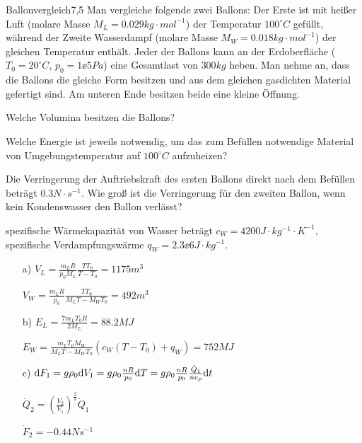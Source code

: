 \begin{problem}{Ballonvergleich}{7,5}
Man vergleiche folgende zwei Ballons: Der Erste ist mit heißer Luft (molare Masse $M_L = 0.029 \unit{kg \cdot mol^{-1}}$) der Temperatur $100^\circ \unit{C}$ gefüllt, während der Zweite Wasserdampf (molare Masse $M_W = 0.018 \unit{kg \cdot mol^{-1}}$) der gleichen Temperatur enthält. Jeder der Ballons kann an der Erdoberfläche ($T_0 = 20^\circ \unit{C}$, $p_0 = 1 \ee{5} \unit{Pa}$) eine Gesamtlast von $300 \unit{kg}$ heben. Man nehme an, dass die Ballons die gleiche Form besitzen und aus dem gleichen gasdichten Material gefertigt sind. Am unteren Ende besitzen beide eine kleine Öffnung.
\begin{abcenum}
 \item Welche Volumina besitzen die Ballons?
 \item Welche Energie ist jeweils notwendig, um das zum Befüllen notwendige Material von Umgebungstemperatur auf $100^\circ \unit{C}$ aufzuheizen?
 \item Die Verringerung der Auftriebskraft des ersten Ballons direkt nach dem Befüllen beträgt $0.3 \unit{N \cdot s^{-1}}$. Wie groß ist die Verringerung für den zweiten Ballon, wenn kein Kondenswasser den Ballon verlässt?
\end{abcenum}
\hinweis spezifische Wärmekapazität von Wasser beträgt $c_W = 4200 \unit{J \cdot kg^{-1} \cdot K^{-1}}$, spezifische Verdampfungswärme $q_W = 2.3 \ee{6} \unit{J \cdot kg^{-1}}$.

\begin{solution}
\begin{itemize}
 \item[a)] $V_L = \frac{m_L R}{p_0 M_L}\frac{TT_0}{T-T_0}=1175 \unit{m^3}$
 \item[]   $V_W = \frac{m_L R}{p_0}\frac{TT_0}{M_L T-M_W T_0}=492 \unit{m^3}$
 \item[b)] $E_L = \frac{7 m_L T_0 R}{2 M_L} = 88.2 \unit{MJ}$
 \item[]   $E_W = \frac{m_L T_0 M_W}{M_L T-M_W T_0} (c_W (T-T_0)+q_W) = 752 \unit{MJ}$
 \item[c)] $\mathrm{d} F_1=g \rho_0 \mathrm{d} V_1=g \rho_0 \frac{nR}{p_0} \mathrm{d} T=g \rho_0 \frac{nR}{p_0} \frac{\dot{Q}_1}{n c_p} \mathrm{d} t$
 \item[]   $\dot{Q}_2=\left( \frac{V_2}{V_1} \right)^\frac 23 \dot{Q}_1$
 \item[]   $\dot{F}_2=-0.44 \unit{Ns^{-1}}$
\end{itemize}
\end{solution}
\end{problem}


